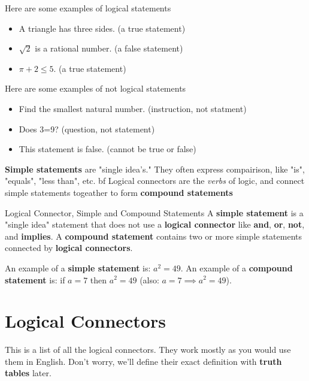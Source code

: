 \begin{boxexample}{}{}
	Here are some examples of logical statements
	\begin{itemize}
		\item A triangle has three sides. (a true statement)
		\item $\sqrt 2$ is a rational number. (a false statement)
		\item $\pi + 2 \leq 5$. (a true statement)
	\end{itemize}
\end{boxexample}

\begin{boxexample}{}{}
	Here are some examples of not logical statements
	\begin{itemize}
		\item Find the smallest natural number. (instruction, not statment)
		\item Does 3=9? (question, not statement)
		\item This statement is false. (cannot be true or false)
	\end{itemize}
\end{boxexample}

{\bf Simple statements} are "single idea's." They often express compairison, like "is", "equals", "less than", etc. {bf Logical connectors} are the \emph{verbs} of logic, and connect simple statements togeather to form {\bf compound statements}

\begin{boxdefine}{Logical Connector, Simple and Compound Statements}{}
	A {\bf simple statement} is a "single idea" statement that does not use a {\bf logical connector} like {\bf and}, {\bf or}, {\bf not}, and {\bf implies}.
	A {\bf compound statement} contains two or more simple statements connected by {\bf logical connectors}.
\end{boxdefine}

\begin{boxexample}{}{}
	An example of a {\bf simple statement} is: $a^2=49$. An example of a {\bf compound statement} is: if $a=7$ then $a^2=49$ (also: $a=7 \implies a^2=49$). 
\end{boxexample}

\section{Logical Connectors}

This is a list of all the logical connectors. They work mostly as you would use them in English. Don't worry, we'll define their exact definition with {\bf truth tables} later.

